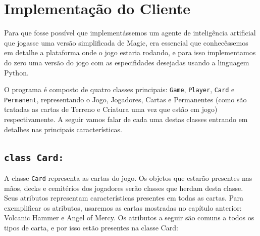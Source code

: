 \chapter{Implementação do Cliente}
Para que fosse possível que implementássemos um agente de inteligência artificial que
jogasse uma versão simplificada de Magic, era essencial que conhecêssemos em detalhe a
plataforma onde o jogo estaria rodando, e para isso implementamos do zero uma versão do
jogo com as especifidades desejadas usando a linguagem Python.

O programa é composto de quatro classes principais: \texttt{Game}, \texttt{Player}, \texttt{Card}
e \texttt{Permanent}, representando o Jogo, Jogadores, Cartas e Permanentes (como são tratadas as
cartas de Terreno e Criatura uma vez que estão em jogo) respectivamente. A seguir vamos falar de
cada uma destas classes entrando em detalhes nas principais características.

\section{\texttt{class Card:}}
A classe \texttt{Card} representa as cartas do jogo. Os objetos que estarão presentes nas mãos,
decks e cemitérios dos jogadores serão classes que herdam desta classe. Seus atributos representam
características presentes em todas as cartas. Para exemplificar os atributos, usaremos as cartas mostradas no capítulo anterior: Volcanic Hammer e Angel of Mercy. Os atributos a seguir são comuns a todos os tipos de carta, e por isso estão presentes na
classe Card:

